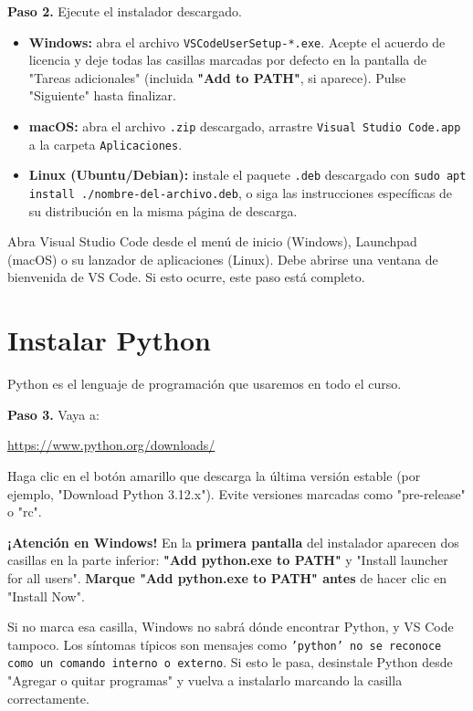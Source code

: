 \documentclass[11pt,a4paper]{article}
\newcommand{\code}[1]{\texttt{#1}}
\newcommand{\link}[1]{\url{#1}}
\begin{document}
\begin{stepbox}
\textbf{Paso 2.} Ejecute el instalador descargado.
\begin{itemize}
  \item \textbf{Windows:} abra el archivo \code{VSCodeUserSetup-*.exe}. Acepte el acuerdo de licencia y deje todas las casillas marcadas por defecto en la pantalla de "Tareas adicionales" (incluida \textbf{"Add to PATH"}, si aparece). Pulse "Siguiente" hasta finalizar.
  \item \textbf{macOS:} abra el archivo \code{.zip} descargado, arrastre \code{Visual Studio Code.app} a la carpeta \code{Aplicaciones}.
  \item \textbf{Linux (Ubuntu/Debian):} instale el paquete \code{.deb} descargado con \code{sudo apt install ./nombre-del-archivo.deb}, o siga las instrucciones específicas de su distribución en la misma página de descarga.
\end{itemize}
\end{stepbox}

\begin{verify}
Abra Visual Studio Code desde el menú de inicio (Windows), Launchpad (macOS) o su lanzador de aplicaciones (Linux). Debe abrirse una ventana de bienvenida de VS Code. Si esto ocurre, este paso está completo.
\end{verify}

\section{Instalar Python}

Python es el lenguaje de programación que usaremos en todo el curso.

\begin{stepbox}
\textbf{Paso 3.} Vaya a:
\begin{center}\link{https://www.python.org/downloads/}\end{center}
Haga clic en el botón amarillo que descarga la última versión estable (por ejemplo, "Download Python 3.12.x"). Evite versiones marcadas como "pre-release" o "rc".
\end{stepbox}

\begin{crit}
\textbf{¡Atención en Windows!} En la \textbf{primera pantalla} del instalador aparecen dos casillas en la parte inferior: \textbf{"Add python.exe to PATH"} y "Install launcher for all users". \textbf{Marque "Add python.exe to PATH" antes} de hacer clic en "Install Now".

Si no marca esa casilla, Windows no sabrá dónde encontrar Python, y VS Code tampoco. Los síntomas típicos son mensajes como \code{'python' no se reconoce como un comando interno o externo}. Si esto le pasa, desinstale Python desde "Agregar o quitar programas" y vuelva a instalarlo marcando la casilla correctamente.
\end{crit}
\end{document}
